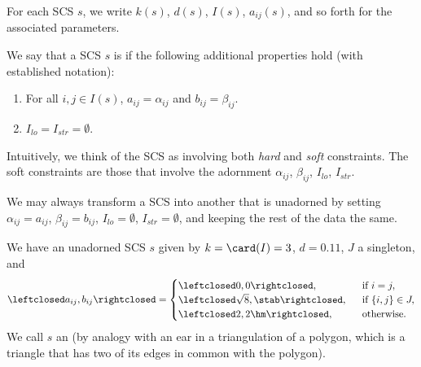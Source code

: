 For each SCS $s$, we write $k(s)$,
$d(s)$, $I(s)$, $a_{ij}(s)$, and so forth for the associated
parameters. 



%

\begin{definition}[unadorned]
We say that a SCS $s$ is  if the following additional
properties hold (with established notation):
\begin{enumerate}
\item For all $i,j\in I(s)$,  $a_{ij}=\alpha_{ij}$ and $b_{ij}=\beta_{ij}$.
\item $I_{lo}=I_{str}=\emptyset$.
\end{enumerate}
\end{definition}

Intuitively, we think of the SCS as involving both {\it hard} and {\it
  soft} constraints.  The soft constraints are those that involve the
adornment $\alpha_{ij}$, $\beta_{ij}$, $I_{lo}$, $I_{str}$.

\begin{example}\label{ex:extend-cs} 
We may always transform a SCS into another that is unadorned by
setting $\alpha_{ij}=a_{ij}$, $\beta_{ij}=b_{ij}$, $I_{lo}=\emptyset$, $I_{str}=\emptyset$, and
keeping the rest of the data the same.
\end{example}


\begin{definition}[ear] 
We have an unadorned SCS $s$ given by
$k=\card(I)=3$, $d=0.11$, $J$ a singleton, 
and
\[
\leftclosed a_{ij},b_{ij}\rightclosed=
\begin{cases}
 \leftclosed0,0\rightclosed,
 &\text{~~if } i=j,\\
 \leftclosed\sqrt8,\stab\rightclosed,
 &\text{~~if } \{i,j\} \in J,\\
 \leftclosed 2,2\hm\rightclosed,
 &\text{~~otherwise. }
\end{cases}
\]
We call $s$ an  (by analogy with an ear
in a triangulation of a polygon, which is a triangle that has two of
its edges in common with the polygon).
\end{definition}


